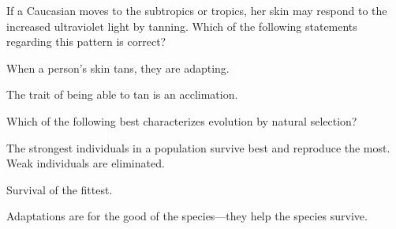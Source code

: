 \begin{noheadline}
\begin{frame}
    \begin{clickerquestion}
        \item If a Caucasian moves to the subtropics or tropics, her skin may
            respond to the increased ultraviolet light by tanning. Which of the
            following statements regarding this pattern is correct?
        \begin{clickeroptions}
            \item When a person's skin tans, they are adapting.
            \item {}
            \item The trait of being able to tan is an acclimation.
            \item {}
        \end{clickeroptions}
    \end{clickerquestion}
\end{frame}
\end{noheadline}

\begin{noheadline}
\begin{frame}
    \begin{clickerquestion}
        \item Which of the following best characterizes evolution by natural
            selection?
        \begin{clickeroptions}
            \item The strongest individuals in a population survive best and
                reproduce the most. Weak individuals are eliminated. 
            \item Survival of the fittest.
            \item {}
            \item Adaptations are for the good of the species---they help the
                species survive.
        \end{clickeroptions}
    \end{clickerquestion}
\end{frame}
\end{noheadline}


